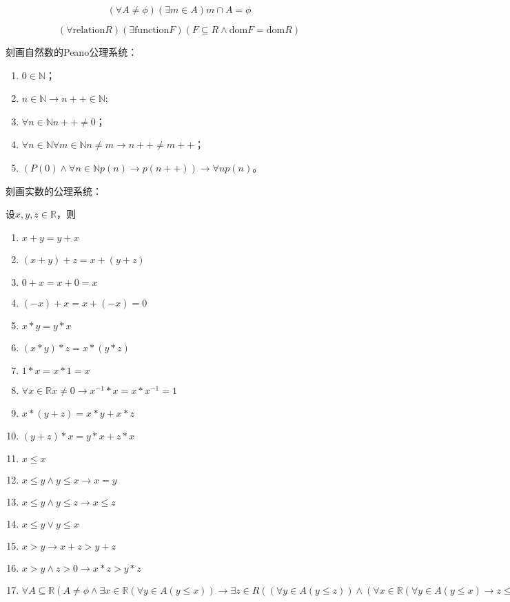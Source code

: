   \begin{Ax}[正则公理]
    \begin{equation*}
      (\forall A \neq \phi) (\exists m \in A) m \cap A = \phi
    \end{equation*}
  \end{Ax}
  \begin{Ax}[选择公理]
    \begin{equation*}
      (\forall \text{relation} R)
      (\exists \text{function} F)
      (F \subseteq R \land
      \text{dom} F
      = \text{dom} R)
    \end{equation*}
  \end{Ax}

  刻画自然数的Peano公理系统：
  \begin{enumerate}
  \item $0 \in \mathbb{N}$；
  \item $n \in \mathbb{N} \rightarrow n ++ \in \mathbb{N}$;
  \item $\forall n \in \mathbb{N} n ++ \neq 0$；
  \item $\forall n \in \mathbb{N} \forall m \in \mathbb{N} n \neq m \rightarrow n ++ \neq m ++$；
    \item $(P(0) \land \forall n \in \mathbb{N} p(n) \rightarrow p(n++) )\rightarrow \forall n p(n)$。 
  \end{enumerate}

  刻画实数的公理系统：
  
     设$x, y, z \in \mathbb{R}$，则
   \begin{enumerate}
   \item   $x + y = y + x$
   \item   $(x + y) + z = x + (y + z)$
   \item   $0 + x = x + 0 = x$
   \item   $(-x) + x = x + (-x) = 0$
   \item   $x * y = y * x$
   \item   $(x * y) * z = x * (y *z)$
   \item   $1 * x = x * 1 = x$
   \item   $\forall x \in \mathbb{R} x \neq 0 \to x^{-1} * x = x * x^{-1} = 1$
   \item   $x* (y + z) = x * y + x * z$
   \item   $(y + z) * x = y * x + z * x$
       \item $x \leq x$
   \item $ x \leq y \land y \leq x \rightarrow x = y$
   \item $x \leq y \land y \leq z \rightarrow x \leq z$
   \item $x \leq y \lor y \leq x$ 
\item $x > y \rightarrow x + z > y + z$
\item $x > y \land z >0 \rightarrow x * z > y * z$
\item   $\forall A \subseteq \mathbb{R} (A \neq \phi \land \exists x \in \mathbb{R} (\forall y \in A (y \leq x)) \rightarrow \exists z \in R ((\forall y \in A (y \leq z) )\land ( \forall x \in \mathbb{R} (\forall y \in A (y \leq x) \rightarrow z \leq x))))$   
    \end{enumerate}

      \chapter{}

